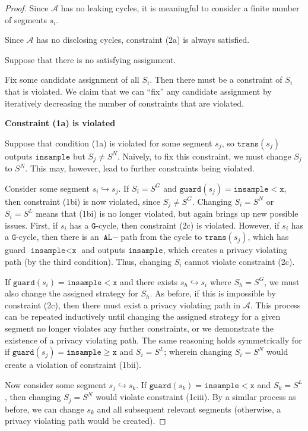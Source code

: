 \documentclass[12pt]{article}
\newcommand{\gguard}[1][x]{\texttt{insample}\geq \texttt{#1}}
\newcommand{\lguard}[1][x]{\texttt{insample} < \texttt{#1}}
\newcommand{\guard}{\texttt{guard}}
\newcommand{\trans}{\texttt{trans}}
\theoremstyle{definition}
\begin{document}
\begin{proof}
	Since $\mathcal{A}$ has no leaking cycles, it is meaningful to consider a finite number of segments $s_i$. 

	Since $\mathcal{A}$ has no disclosing cycles, constraint (2a) is always satisfied.

	Suppose that there is no satisfying assignment. 

	Fix some candidate assignment of all $S_i$. Then there must be a constraint of $S_i$ that is violated. We claim that we can ``fix'' any candidate assignment by iteratively decreasing the number of constraints that are violated. 
	
	\textbf{Constraint (1a) is violated}

	Suppose that condition (1a) is violated for some segment $s_j$, so $\trans(s_j)$ outputs $\texttt{insample}$ but $S_j \neq S^N$. Naively, to fix this constraint, we must change $S_j$ to $S^N$. This may, however, lead to further constraints being violated. 

	Consider some segment $s_i\hookrightarrow s_j$. If $S_i = S^G$ and $\guard(s_j) = \lguard$, then constraint (1bi) is now violated, since $S_j \neq S^G$. Changing $S_i = S^N$ or $S_i = S^L$ means that (1bi) is no longer violated, but again brings up new possible issues. First, if $s_i$ has a $\texttt{G}$-cycle, then constraint (2c) is violated. 
	However, if $s_i$ has a $\texttt{G}$-cycle, then there is an $\texttt{AL}-$path from the cycle to $\trans(s_j)$, which has guard $\lguard$ and outputs $\texttt{insample}$, which creates a privacy violating path (by the third condition). Thus, changing $S_i$ cannot violate constraint (2c).

	If $\guard(s_i) = \lguard$ and there exists $s_h\hookrightarrow s_i$ where $S_h = S^G$, we must also change the assigned strategy for $S_h$. As before, if this is impossible by constraint (2c), then there must exist a privacy violating path in $\mathcal{A}$. This process can be repeated inductively until changing the assigned strategy for a given segment no longer violates any further constraints, or we demonstrate the existence of a privacy violating path. 
	The same reasoning holds symmetrically for if $\guard(s_j) = \gguard$ and $S_i = S^L$; wherein changing $S_i = S^N$ would create a violation of constraint (1bii).

	Now consider some segment $s_j \hookrightarrow s_k$. If $\guard(s_k) = \lguard$ and $S_k = S^L$, then changing $S_j = S^N$ would violate constraint (1ciii). By a similar process as before, we can change $s_k$ and all subsequent relevant segments (otherwise, a privacy violating path would be created).


\end{proof}
\end{document}
